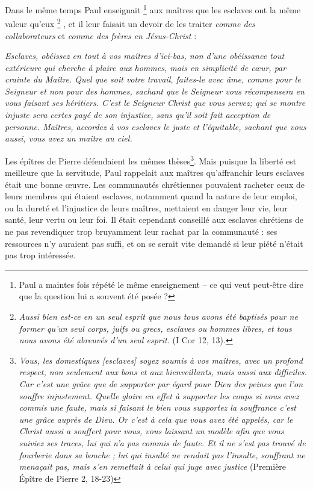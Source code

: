  Dans le même temps Paul enseignait%
\footnote{Paul a maintes fois répété le même enseignement -- ce qui veut peut-être dire que la question lui a souvent été posée ?} 
aux maîtres que les esclaves ont la même valeur qu'eux%
\footnote{\emph{Aussi bien est-ce en un seul esprit que nous tous avons été baptisés pour ne former qu'un seul corps, juifs ou grecs, esclaves ou hommes libres, et tous nous avons été abreuvés d'un seul esprit.} (I Cor 12, 13).}%
, et il leur faisait un devoir de les traiter \emph{comme des collaborateurs} et \emph{comme des frères en Jésus-Christ} :

\begin{displayquote}[Col 3, 22-25 ; 4,1]
\emph{Esclaves, obéissez en tout à vos maîtres d'ici-bas, non d'une obéissance tout extérieure qui cherche à plaire aux hommes, mais en simplicité de cœur, par crainte du Maître. Quel que soit votre travail, faites-le avec âme, comme pour le Seigneur et non pour des hommes, sachant que le Seigneur vous récompensera en vous faisant ses héritiers. C'est le Seigneur Christ que vous servez; qui se montre injuste sera certes payé de son injustice, sans qu'il soit fait acception de personne. Maîtres, accordez à vos esclaves le juste et l'équitable, sachant que vous aussi, vous avez un maître au ciel.}
\end{displayquote}

 Les épîtres de Pierre défendaient les mêmes thèses\footnote{\emph{Vous, les domestiques \emph{[esclaves]} soyez soumis à vos maîtres, avec un profond respect, non seulement aux bons et aux bienveillants, mais aussi aux difficiles. Car c'est une grâce que de supporter par égard pour Dieu des peines que l'on souffre injustement. Quelle gloire en effet à supporter les coups si vous avez commis une faute, mais si faisant le bien vous supportez la souffrance c'est une grâce auprès de Dieu. Or c'est à cela que vous avez été appelés, car le Christ aussi a souffert pour vous, vous laissant un modèle afin que vous suiviez ses traces, lui qui n'a pas commis de faute. Et il ne s'est pas trouvé de fourberie dans sa bouche ; lui qui insulté ne rendait pas l'insulte, souffrant ne menaçait pas, mais s'en remettait à celui qui juge avec justice} (Première Épître de Pierre 2, 18-23)}. Mais puisque la liberté est meilleure que la servitude, Paul rappelait aux maîtres qu'affranchir leurs esclaves était une bonne œuvre. Les communautés chrétiennes pouvaient racheter ceux de leurs membres qui étaient esclaves, notamment quand la nature de leur emploi, ou la dureté et l'injustice de leurs maîtres, mettaient en danger leur vie, leur santé, leur vertu ou leur foi. Il était cependant conseillé aux esclaves chrétiens de ne pas revendiquer trop bruyamment leur rachat par la communauté : ses ressources n'y auraient pas suffi, et on se serait vite demandé si leur piété n'était pas trop intéressée.

